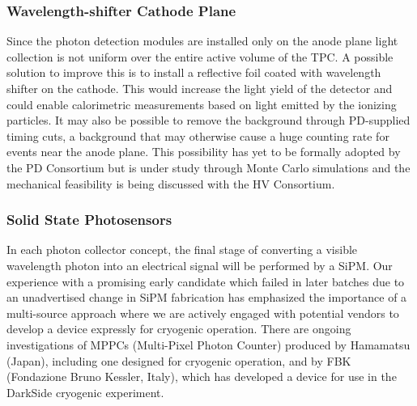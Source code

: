 \subsubsection{Wavelength-shifter Cathode Plane} 
Since the photon detection modules are installed only on the anode plane light collection is not uniform over the entire active volume of the TPC. A possible solution to improve this is to install a reflective foil coated with wavelength shifter on the cathode.
This would increase the light yield of the detector and could enable calorimetric measurements based on light emitted by the ionizing particles. It may also be possible to remove the  background through PD-supplied timing cuts, a background that may otherwise cause a huge counting rate for events near  the anode plane. This possibility has yet to be formally adopted by the PD Consortium but is under study through Monte Carlo simulations and the mechanical feasibility is being discussed with the HV Consortium.


\subsubsection{Solid State Photosensors} 
In each photon collector concept, the final stage of converting a visible wavelength photon into an electrical signal will be performed by a SiPM. Our experience with a promising early candidate which failed in later batches due to an unadvertised change in SiPM fabrication has emphasized the importance of a multi-source approach where we are actively engaged with potential vendors to develop a device expressly for cryogenic operation. There are ongoing investigations of MPPCs (Multi-Pixel Photon Counter) produced by Hamamatsu (Japan), including one designed for cryogenic operation, and by FBK (Fondazione Bruno Kessler, Italy), which has developed a device for use in the DarkSide cryogenic experiment.

